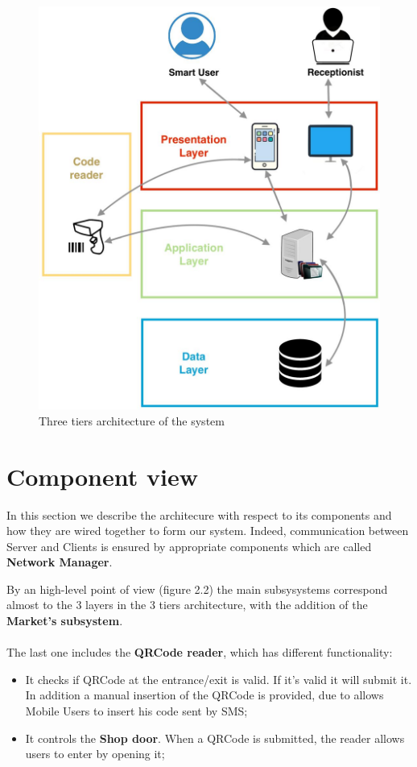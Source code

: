 \begin{figure}[H]
  \label{3tiers}
  \centering
  \includegraphics[scale=0.30]{diagrams/3_tiers.jpeg}
  \caption{Three tiers architecture of the system}

\end{figure}


\section{Component view}



In this section we describe the architecure with respect to its components and how they are wired together to form our system. 
Indeed, communication between Server and Clients is ensured by appropriate components which are called \textbf{Network Manager}. \par 
By an high-level point of view (figure 2.2) the main subsysystems correspond almost to the 3 layers in the 3 tiers architecture, with the addition of the \textbf{Market's subsystem}. \\ \\
The last one includes the \textbf{QRCode reader}, which has different functionality:
\begin{itemize}
\item It checks if QRCode at the entrance/exit is valid. If it's valid it will submit it. In addition a manual insertion of the QRCode is provided, due to allows Mobile Users to insert his code sent by SMS;
\item It controls the \textbf{Shop door}. When a QRCode is submitted, the reader allows users to enter by opening it;
\end{itemize}


